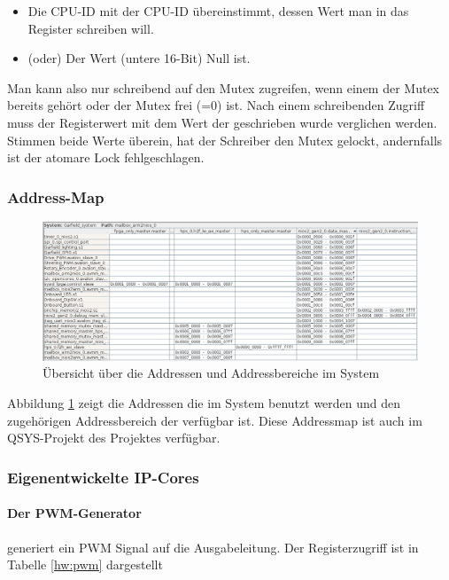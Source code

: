 \begin{itemize}
	\begin{itemize}
		\item Die CPU-ID mit der CPU-ID übereinstimmt, dessen Wert man in das Register schreiben will.
		\item (oder) Der Wert (untere 16-Bit) Null ist.
	\end{itemize}
	Man kann also nur schreibend auf den Mutex zugreifen, wenn einem der Mutex bereits gehört oder der Mutex frei (=0) ist. Nach einem schreibenden Zugriff muss der Registerwert mit dem Wert der geschrieben wurde verglichen werden. Stimmen beide Werte überein, hat der Schreiber den Mutex gelockt, andernfalls ist der atomare Lock fehlgeschlagen.
\end{itemize}

\subsubsection{Address-Map}

\begin{figure}
	\includegraphics[width=\textwidth]{Abb/Address_Map.png}
	\caption{Übersicht über die Addressen und Addressbereiche im System}
	\label{FPGA:AddrMap}
\end{figure}

Abbildung \ref{FPGA:AddrMap} zeigt die Addressen die im System benutzt werden und den zugehörigen Addressbereich der verfügbar ist. Diese Addressmap ist auch im QSYS-Projekt des Projektes verfügbar.

\subsubsection{Eigenentwickelte \ac{IP}-Cores}

\paragraph{Der PWM-Generator} generiert ein PWM Signal auf die Ausgabeleitung. Der Registerzugriff ist in Tabelle \ref{hw:pwm} dargestellt

